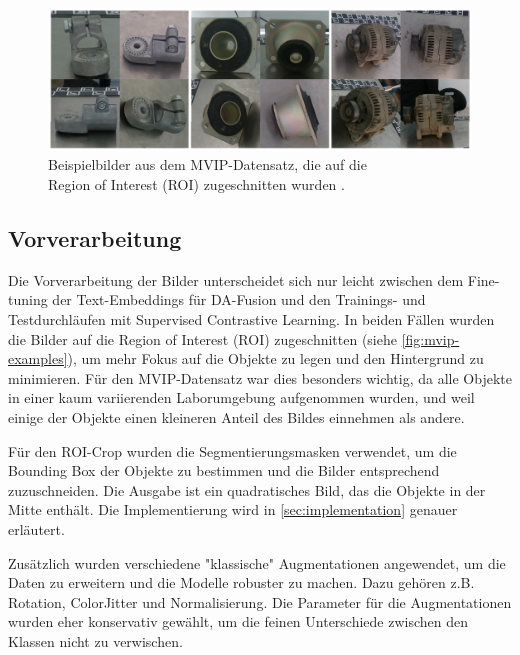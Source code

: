 \begin{figure}[h]
	\centering
	\includegraphics[width=\textwidth]{images/figure_mvip_ex_cropped_2.png}
	\caption[Beispielbilder aus dem MVIP-Datensatz, die auf die	Region of Interest (ROI) zugeschnitten wurden.]{Beispielbilder aus dem MVIP-Datensatz, die auf die\\
	Region of Interest (ROI) zugeschnitten wurden \parencite{Koch2023mvip}.}
	\label{fig:mvip-examples}
\end{figure}

\subsection{Vorverarbeitung} \label{subsec:preprocessing}

Die Vorverarbeitung der Bilder unterscheidet sich nur leicht zwischen dem Fine-tuning der Text-Embeddings für DA-Fusion und den Trainings- und Testdurchläufen mit Supervised Contrastive Learning. In beiden Fällen wurden die Bilder auf die Region of Interest (ROI) zugeschnitten (siehe \autoref{fig:mvip-examples}), um mehr Fokus auf die Objekte zu legen und den Hintergrund zu minimieren. Für den MVIP-Datensatz war dies besonders wichtig, da alle Objekte in einer kaum variierenden Laborumgebung aufgenommen wurden, und weil einige der Objekte einen kleineren Anteil des Bildes einnehmen als andere.

Für den ROI-Crop wurden die Segmentierungsmasken verwendet, um die Bounding Box der Objekte zu bestimmen und die Bilder entsprechend zuzuschneiden. Die Ausgabe ist ein quadratisches Bild, das die Objekte in der Mitte enthält. Die Implementierung wird in \autoref{sec:implementation} genauer erläutert.

Zusätzlich wurden verschiedene "klassische" Augmentationen angewendet, um die Daten zu erweitern und die Modelle robuster zu machen. Dazu gehören z.B. Rotation, ColorJitter und Normalisierung. Die Parameter für die Augmentationen wurden eher konservativ gewählt, um die feinen Unterschiede zwischen den Klassen nicht zu verwischen.

